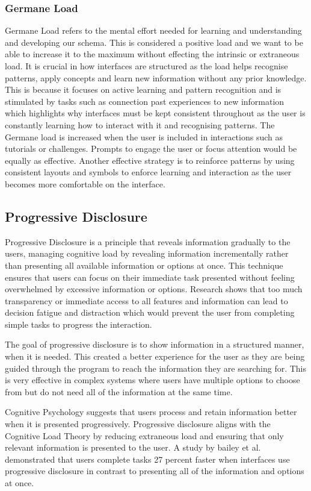 \documentclass[]{project_final}
\begin{document}
\subsubsection{Germane Load}
Germane Load refers to the mental effort needed for learning and understanding and developing our schema. This is considered a positive load and we want to be able to increase
it to the maximum without effecting the intrinsic or extraneous load. It is crucial in how
interfaces are structured as the load helps recognise patterns, apply concepts and learn new
information without any prior knowledge. This is because it focuses on active learning and
pattern recognition and is stimulated by tasks such as connection past experiences to new
information which highlights why interfaces must be kept consistent throughout as the user
is constantly learning how to interact with it and recognising patterns.
The Germane load is increased when the user is included in interactions such as tutorials
or challenges. Prompts to engage the user or focus attention would be equally as effective.
Another effective strategy is to reinforce patterns by using consistent layouts and symbols to
enforce learning and interaction as the user becomes more comfortable on the interface.
\subsection{Progressive Disclosure}
Progressive Disclosure is a principle that reveals information gradually to the users, managing cognitive load by revealing information incrementally rather than presenting all available information or options at once. This technique ensures that users can focus on their immediate task presented without feeling overwhelmed by excessive information or options. Research shows that too much transparency or immediate access to all features and information can lead to decision fatigue and distraction which would prevent the user from completing simple tasks to progress the interaction.

The goal of progressive disclosure is to show information in a structured manner, when it is needed. This created a better experience for the user as they are being guided through the program to reach the information they are searching for. This is very effective in complex systems where users have multiple options to choose from but do not need all of the information at the same time.

Cognitive Psychology suggests that users process and retain information better when it is presented progressively. Progressive disclosure aligns with the Cognitive Load Theory by reducing extraneous load and ensuring that only relevant information is presented to the user. A study by bailey et al. demonstrated that users complete tasks 27 percent faster when interfaces use progressive disclosure in contrast to presenting all of the information and options at once.
\end{document}
